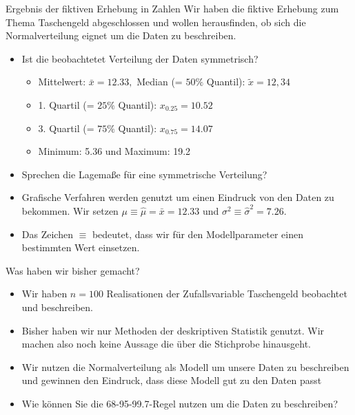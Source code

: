 \documentclass[usenames,dvipsnames,handout]{beamer}
\begin{document}
\begin{frame}{Ergebnis der fiktiven Erhebung in Zahlen}
Wir haben die fiktive Erhebung zum Thema Taschengeld abgeschlossen und wollen herausfinden,
ob sich die Normalverteilung eignet um die Daten zu beschreiben.
\begin{itemize}
\item{Ist die beobachtetet Verteilung der Daten symmetrisch?}
\begin{itemize}
\item{Mittelwert: $\bar{x}=12.33,$ Median (= $50\%$ Quantil): $\tilde{x}=12,34$}\pause
\item{1. Quartil (= $25\%$ Quantil): $x_{0.25}=10.52$}\pause
\item{3. Quartil (= $75\%$ Quantil): $x_{0.75}=14.07$}\pause
\item{Minimum: 5.36 und Maximum: 19.2}\pause
\end{itemize}
\item{Sprechen die Lagemaße für eine symmetrische Verteilung?}\pause
\item{Grafische Verfahren werden genutzt um einen Eindruck von den Daten zu bekommen. Wir setzen $\mu \equiv \hat{\mu}=\bar{x}=12.33$ und $\sigma^{2} \equiv \hat{\sigma}^{2}=7.26.$}\pause
\item{Das Zeichen $\equiv$ bedeutet, dass wir für den Modellparameter einen bestimmten Wert einsetzen.}
\end{itemize}
\end{frame}
%
%
%






\begin{frame}{Was haben wir bisher gemacht?}
\begin{itemize}
\item{Wir haben $n=100$ Realisationen der Zufallsvariable Taschengeld beobachtet
und beschreiben.}\pause
\item{Bisher haben wir nur Methoden der deskriptiven Statistik genutzt. Wir machen also
noch keine Aussage die über die Stichprobe hinausgeht.}\pause
\item{Wir nutzen die Normalverteilung als Modell um unsere Daten zu beschreiben
und gewinnen den Eindruck, dass diese Modell gut zu den Daten passt}\pause
\item{Wie können Sie die 68-95-99.7-Regel nutzen um die Daten zu beschreiben?}
\end{itemize}
\end{frame}
\end{document}
